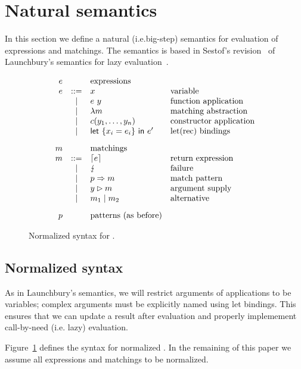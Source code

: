 \section{Natural semantics}\label{sec:bigstep}

In this section we define a natural (i.e.\@ big-step) semantics for
evaluation of expressions and matchings.  The semantics is based in
Sestof's revision~\cite{sestof_1997} of Launchbury's semantics for
lazy evaluation~\cite{launchbury_1993}.

\begin{figure}
  \[
    \begin{array}{rcll}
      e & &     \text{expressions} \\
      e & ::= &  x  & \text{variable} \\
      & | &  e~y & \text{function application} \\
      & | & \lambda m & \text{matching abstraction} \\
      & | & c(y_1,\ldots,y_n) & \text{constructor application} \\
      & | & \textsf{let}~\{x_i=e_i\}~\textsf{in}~e' & \text{let(rec) bindings} \\[2ex]
      m &  & \text{matchings} \\
      m & ::= & \left\lceil e\right\rceil & \text{return expression}\\
      & | & \lightning & \text{failure} \\
      & | & p \Rightarrow m & \text{match pattern} \\
      & | & y\rhd m & \text{argument supply}\\
      & | & m_1 \mid m_2 & \text{alternative}\\[2ex]
      p & & \text{patterns (as before)}
  \end{array}
\]
\caption{Normalized syntax for \lambdaPMC.}\label{fig:syntax-normalized}
\end{figure}

\subsection{Normalized syntax}
As in Launchbury's semantics, we will restrict arguments of
applications to be variables; complex arguments must be explicitly
named using let bindings.  This ensures that we can update a result
after evaluation and properly implemement call-by-need (i.e. lazy)
evaluation.

Figure~\ref{fig:syntax-normalized} defines the syntax for normalized
\lambdaPMC. In the remaining of this paper we assume all expressions
and matchings to be normalized.

